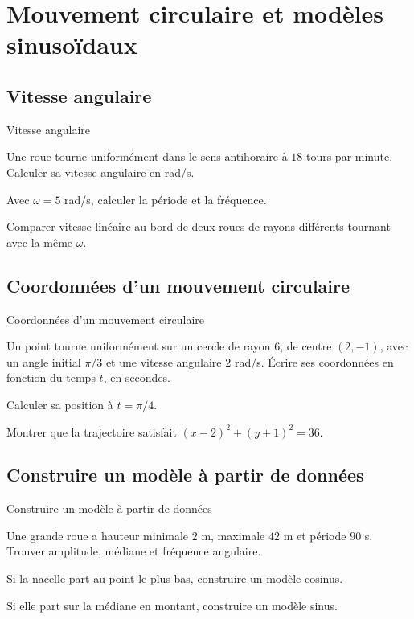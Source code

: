 \chapter{Mouvement circulaire et modèles sinusoïdaux}
\label{workbook:chapter:17}
\section{Vitesse angulaire}
\label{workbook:section:17.01}
\begin{exerciseblock}{Vitesse angulaire}
\item Une roue tourne uniformément dans le sens antihoraire à $18$ tours par minute. Calculer sa vitesse angulaire en rad/s.
\item Avec $\omega=5$ rad/s, calculer la période et la fréquence.
\item Comparer vitesse linéaire au bord de deux roues de rayons différents tournant avec la même $\omega$.
\end{exerciseblock}
\section{Coordonnées d'un mouvement circulaire}
\label{workbook:section:17.02}
\begin{exerciseblock}{Coordonnées d'un mouvement circulaire}
\item Un point tourne uniformément sur un cercle de rayon $6$, de centre $(2,-1)$, avec un angle initial $\pi/3$ et une vitesse angulaire $2$ rad/s. Écrire ses coordonnées en fonction du temps $t$, en secondes.
\item Calculer sa position à $t=\pi/4$.
\item Montrer que la trajectoire satisfait $(x-2)^2+(y+1)^2=36$.
\end{exerciseblock}
\section{Construire un modèle à partir de données}
\label{workbook:section:17.03}
\begin{exerciseblock}{Construire un modèle à partir de données}
\item Une grande roue a hauteur minimale $2$ m, maximale $42$ m et période $90$ s. Trouver amplitude, médiane et fréquence angulaire.
\item Si la nacelle part au point le plus bas, construire un modèle cosinus.
\item Si elle part sur la médiane en montant, construire un modèle sinus.
\end{exerciseblock}
